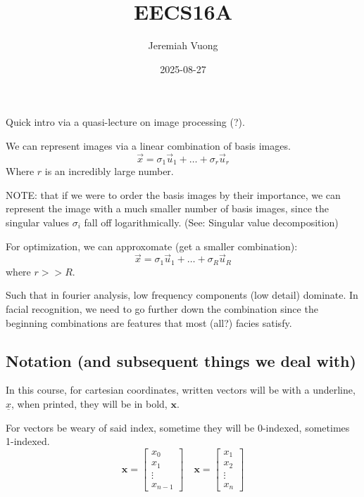 \documentclass{article}
\title{EECS16A}
\author{Jeremiah Vuong}
\date{2025-08-27}
\begin{document}

\maketitle

\tableofcontents
\newpage

Quick intro via a quasi-lecture on image processing (?).

We can represent images via a linear combination of basis images.
$$
\vec{x} = \sigma_1 \vec{u}_1 + \ldots + \sigma_r \vec{u}_r
$$
Where $r$ is an incredibly large number.

NOTE: that if we were to order the basis images by their importance, we can represent the image with a much smaller number of basis images,
since the singular values $\sigma_i$ fall off logarithmically. (See: Singular value decomposition)

For optimization, we can approxomate (get a smaller combination):
$$ \vec{x} = \sigma_1 \vec{u}_1 + \ldots + \sigma_R \vec{u}_R $$
where $r >> R$.

Such that in fourier analysis, low frequency components (low detail) dominate.
In facial recognition, we need to go further down the combination since the beginning combinations
are features that most (all?) facies satisfy.


\subsection{Notation (and subsequent things we deal with)}

In this course, for cartesian coordinates, written vectors will be with a underline, $\underline{x}$,
when printed, they will be in bold, $\bm{x}$.

For vectors be weary of said index, sometime they will be 0-indexed, sometimes 1-indexed.
$$ \bm{x} = \begin{bmatrix} x_0 \\ x_1 \\ \vdots \\ x_{n-1} \end{bmatrix}
\quad \bm{x} = \begin{bmatrix} x_1 \\ x_2 \\ \vdots \\ x_{n} \end{bmatrix}$$
\end{document}
